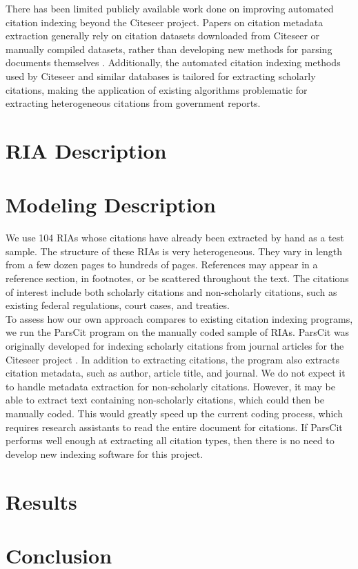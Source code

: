 \documentclass[12pt]{article}
\begin{document}
There has been limited publicly available work done on improving automated citation indexing beyond the Citeseer project. Papers on citation metadata extraction generally rely on citation datasets downloaded from Citeseer or manually compiled datasets, rather than developing new methods for parsing documents themselves \cite{anzaroot2013}. Additionally, the automated citation indexing methods used by Citeseer and similar databases is tailored for extracting scholarly citations, making the application of existing algorithms problematic for extracting heterogeneous citations from government reports.\\


\section{RIA Description}

\section{Modeling Description}
We use 104 RIAs whose citations have already been extracted by hand as a test sample. The structure of these RIAs is very heterogeneous. They vary in length from a few dozen pages to hundreds of pages. References may appear in a reference section, in footnotes, or be scattered throughout the text. The citations of interest include both scholarly citations and non-scholarly citations, such as existing federal regulations, court cases, and treaties. \\ 

To assess how our own approach compares to existing citation indexing programs, we run the ParsCit program on the manually coded sample of RIAs. ParsCit was originally developed for indexing scholarly citations from journal articles for the Citeseer project \cite{councilletal2008}. In addition to extracting citations, the program also extracts citation metadata, such as author, article title, and journal. We do not expect it to handle metadata extraction for non-scholarly citations. However, it may be able to extract text containing non-scholarly citations, which could then be manually coded. This would greatly speed up the current coding process, which requires research assistants to read the entire document for citations. If ParsCit performs well enough at extracting all citation types, then there is no need to develop new indexing software for this project.\\


\section{Results}

\section{Conclusion}

\clearpage
\singlespace

\nocite{*}

\clearpage
\end{document}
